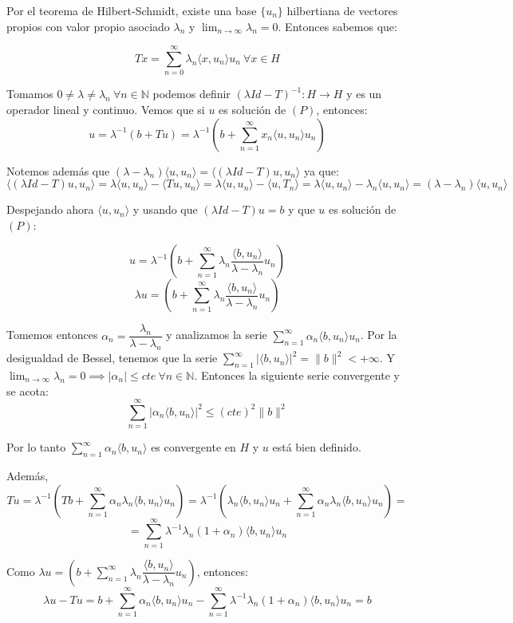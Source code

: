 \documentclass[openany]{book}
\begin{document}
\begin{demonstration}
    Por el teorema de Hilbert-Schmidt, existe una base $ \{u_n\}$ hilbertiana de vectores propios con valor propio asociado $ \lambda_n $ y $ \lim_{n \to \infty}\lambda_n = 0 $. Entonces sabemos que:

    $$ Tx = \sum\limits_{n=0}^{\infty} \lambda_n \langle x, u_n \rangle u_n \ \forall x \in H $$

    Tomamos $ 0 \ne \lambda  \ne \lambda_n \ \forall n \in \mathbb{N}$ podemos definir $ (\lambda Id-T) ^{-1}: H \to H$ y es un operador lineal y continuo. Vemos que si $ u$ es solución de $ (P)$, entonces:
    $$ u = \lambda ^{-1} (b +Tu) = \lambda  ^{-1} \left(  b + \sum\limits_{n=1}^{\infty}x_n \langle u, u_n \rangle u_n\right)$$

    Notemos además que $ (\lambda -\lambda_n ) \langle u, u_n \rangle  = \langle (\lambda Id - T)  u, u_n \rangle $ ya que:
    $$\langle (\lambda Id - T)  u, u_n \rangle= \lambda \langle u, u_n \rangle - \langle Tu, u_n \rangle  = \lambda \langle u, u_n \rangle - \langle u, T_n \rangle  = \lambda \langle u, u_n \rangle - \lambda_n \langle u, u_n \rangle  = (\lambda -\lambda_n ) \langle u, u_n \rangle  $$

    Despejando ahora $ \langle u, u_n \rangle $ y usando que $ (\lambda Id-T)u = b$ y que $ u$ es solución de $ (P)$:

    $$ u = \lambda ^{-1} \left( b+ \sum\limits_{n=1}^{\infty}\lambda_n \dfrac{\langle b, u_n \rangle }{\lambda -\lambda_n } u_n  \right) $$
    $$ \lambda  u =  \left( b+ \sum\limits_{n=1}^{\infty}\lambda_n \dfrac{\langle b, u_n \rangle }{\lambda -\lambda_n } u_n  \right) $$

    Tomemos entonces $ \alpha_{n} = \dfrac{\lambda_n }{\lambda -\lambda_n }$ y analizamos la serie $ \sum\limits_{n=1}^{\infty} \alpha_n \langle b, u_n \rangle u_n $. Por la desigualdad de Bessel, tenemos que la serie $ \sum\limits_{n=1}^{\infty} |\langle b, u_n \rangle |^2 = \|b\|^2 < + \infty$. Y $ \lim_{n \to \infty}\lambda_n = 0 \implies |\alpha_n| \leq  cte \ \forall n \in \mathbb{N} $. Entonces la siguiente serie convergente y se acota:
    $$ \sum\limits_{n=1}^{\infty} |\alpha_n \langle b, u_n \rangle |^2 \leq  (cte)^2 \|b\|^2 $$

    Por lo tanto $ \sum\limits_{n=1}^{\infty} \alpha_n \langle b, u_n \rangle $ es convergente en $ H$ y $ u$ está bien definido.

    Además,
    $$ Tu = \lambda ^{-1}\left(Tb + \sum\limits_{n=1}^{\infty} \alpha_n\lambda_n \langle b, u_n \rangle u_n\right) = \lambda ^{-1} \left(  \lambda_n \langle b, u_n \rangle u_n + \sum\limits_{n=1}^{\infty} \alpha_n \lambda_n \langle b, u_n \rangle u_n \right) = $$
    $$ = \sum\limits_{n=1}^{\infty} \lambda ^{-1} \lambda_n (1+\alpha_n) \langle b, u_n \rangle u_n $$

    Como $ \lambda  u =  \left( b+ \sum\limits_{n=1}^{\infty}\lambda_n \dfrac{\langle b, u_n \rangle }{\lambda -\lambda_n } u_n  \right)$, entonces:
    $$ \lambda u -Tu = b+ \sum\limits_{n=1}^{\infty}\alpha_n \langle b, u_n \rangle u_n - \sum\limits_{n=1}^{\infty} \lambda ^{-1}\lambda_n (1+\alpha_n) \langle b, u_n \rangle u_n = b $$

\end{demonstration}
\end{document}
